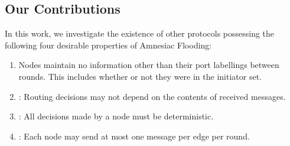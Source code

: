 

% 


\subsection{Our Contributions}

In this work,
we investigate the existence of other protocols possessing the following four desirable properties of Amnesiac Flooding:
\begin{enumerate}
    \item \anew{\StrictStatelessness:}
    Nodes maintain no information other than their port labellings between rounds. This includes whether or not they were in the initiator set.
    \item \Obliviousness: Routing decisions may not depend on the contents of received messages.
    \item \Determinism: All decisions made by a node must be deterministic.
    \item \Bandwidth: Each node may send at most one message per edge per round.
\end{enumerate}

